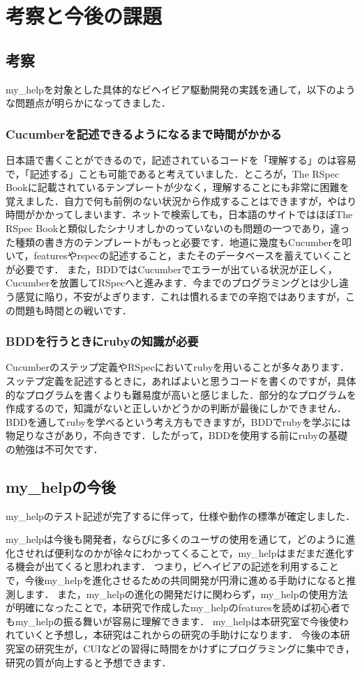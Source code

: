 \section{考察と今後の課題}
\subsection{考察}
my\_helpを対象とした具体的なビヘイビア駆動開発の実践を通して，以下のような問題点が明らかになってきました．

\subsubsection{Cucumberを記述できるようになるまで時間がかかる}
日本語で書くことができるので，記述されているコードを「理解する」のは容易で，「記述する」ことも可能であると考えていました．ところが，The RSpec Book\cite{RSpecBook}に記載されているテンプレートが少なく，理解することにも非常に困難を覚えました．自力で何も前例のない状況から作成することはできますが，やはり時間がかかってしまいます．ネットで検索しても，日本語のサイトではほぼThe RSpec Book\cite{RSpecBook}と類似したシナリオしかのっていないのも問題の一つであり，違った種類の書き方のテンプレートがもっと必要です．地道に幾度もCucumberを叩いて，featuresやrspecの記述すること，またそのデータベースを蓄えていくことが必要です．
また，BDDではCucumberでエラーが出ている状況が正しく，Cucumberを放置してRSpecへと進みます．今までのプログラミングとは少し違う感覚に陥り，不安がよぎります．これは慣れるまでの辛抱ではありますが，この問題も時間との戦いです．

\subsubsection{BDDを行うときにrubyの知識が必要}
Cucumberのステップ定義やRSpecにおいてrubyを用いることが多々あります．スッテプ定義を記述するときに，あればよいと思うコードを書くのですが，具体的なプログラムを書くよりも難易度が高いと感じました．部分的なプログラムを作成するので，知識がないと正しいかどうかの判断が最後にしかできません．BDDを通してrubyを学べるという考え方もできますが，BDDでrubyを学ぶには物足りなさがあり，不向きです．したがって，BDDを使用する前にrubyの基礎の勉強は不可欠です．

\subsection{my\_helpの今後}
my\_helpのテスト記述が完了するに伴って，仕様や動作の標準が確定しました．

my\_helpは今後も開発者，ならびに多くのユーザの使用を通じて，どのように進化させれば便利なのかが徐々にわかってくることで，my\_helpはまだまだ進化する機会が出てくると思われます．
つまり，ビヘイビアの記述を利用することで，今後my\_helpを進化させるための共同開発が円滑に進める手助けになると推測します．
また，my\_helpの進化の開発だけに関わらず，my\_helpの使用方法が明確になったことで，本研究で作成したmy\_helpのfeaturesを読めば初心者でもmy\_helpの振る舞いが容易に理解できます．
my\_helpは本研究室で今後使われていくと予想し，本研究はこれからの研究の手助けになります．
今後の本研究室の研究生が，CUIなどの習得に時間をかけずにプログラミングに集中でき，研究の質が向上すると予想できます．

